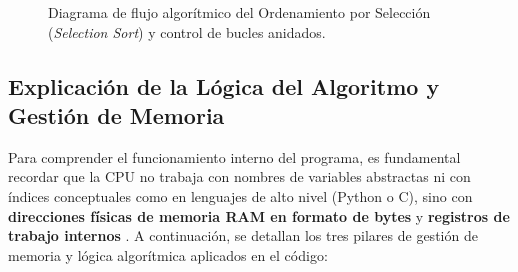\documentclass[12pt,a4paper]{article}
\begin{document}
\begin{figure}[H]
{%
} %
\caption{Diagrama de flujo algorítmico del Ordenamiento por Selección (\textit{Selection Sort}) y control de bucles anidados.}
\label{fig:mips_algorithm_flowchart}
\end{figure}


\subsection{Explicación de la Lógica del Algoritmo y Gestión de Memoria}

Para comprender el funcionamiento interno del programa, es fundamental recordar que la CPU no trabaja con nombres de variables abstractas ni con índices conceptuales como en lenguajes de alto nivel (Python o C), sino con \textbf{direcciones físicas de memoria RAM en formato de bytes} y \textbf{registros de trabajo internos} \cite{patterson}. A continuación, se detallan los tres pilares de gestión de memoria y lógica algorítmica aplicados en el código:
\end{document}
